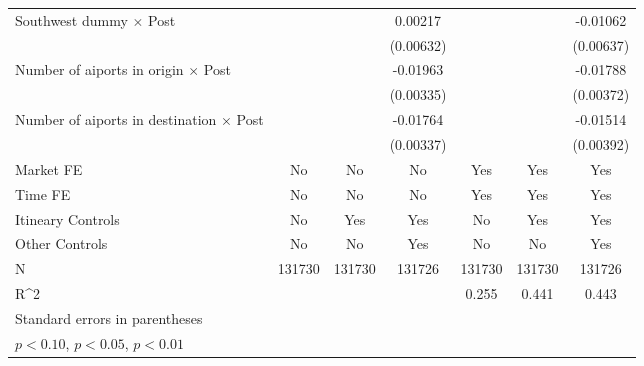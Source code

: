 \begin{table}[htbp]
\begin{tabular}{l*{6}{c}}
\addlinespace
Southwest dummy $\times$ Post&                     &                     &     0.00217         &                     &                     &    -0.01062\sym{*}  \\
                    &                     &                     &   (0.00632)         &                     &                     &   (0.00637)         \\
\addlinespace
Number of aiports in origin $\times$ Post&                     &                     &    -0.01963\sym{***}&                     &                     &    -0.01788\sym{***}\\
                    &                     &                     &   (0.00335)         &                     &                     &   (0.00372)         \\
\addlinespace
Number of aiports in destination $\times$ Post&                     &                     &    -0.01764\sym{***}&                     &                     &    -0.01514\sym{***}\\
                    &                     &                     &   (0.00337)         &                     &                     &   (0.00392)         \\
\midrule
Market FE           &          No         &          No         &          No         &         Yes         &         Yes         &         Yes         \\
Time FE             &          No         &          No         &          No         &         Yes         &         Yes         &         Yes         \\
Itineary Controls   &          No         &         Yes         &         Yes         &          No         &         Yes         &         Yes         \\
Other Controls      &          No         &          No         &         Yes         &          No         &          No         &         Yes         \\
N                   &      131730         &      131730         &      131726         &      131730         &      131730         &      131726         \\
R^2                 &                     &                     &                     &       0.255         &       0.441         &       0.443         \\
\bottomrule
\multicolumn{7}{l}{\footnotesize Standard errors in parentheses}\\
\multicolumn{7}{l}{\footnotesize \sym{*} \(p<0.10\), \sym{**} \(p<0.05\), \sym{***} \(p<0.01\)}\\
\end{tabular}
\end{table}
